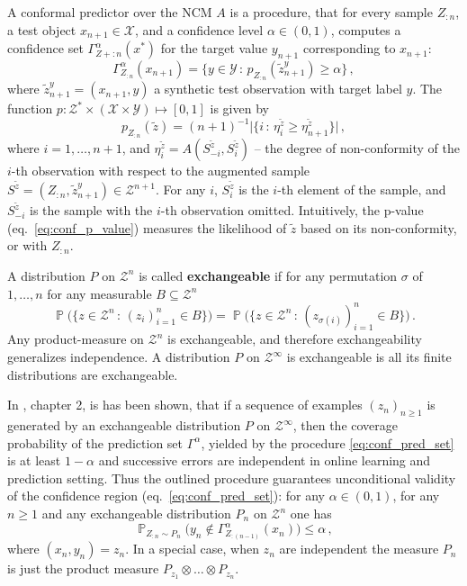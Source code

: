 \documentclass[a4paper,14pt]{extarticle}
\newcommand{\pr}{\mathop{\mathbb{P}}\nolimits}
\newcommand{\Xcal}{\mathcal{X}}
\newcommand{\Ycal}{\mathcal{Y}}
\newcommand{\Zcal}{\mathcal{Z}}
\begin{document}
A conformal predictor over the NCM $A$ is a procedure, that for every sample $Z_{:n}$,
a test object $x_{n+1} \in \Xcal$, and a confidence level $\alpha\in(0,1)$, computes
a confidence set $\Gamma_{Z+{:n}}^\alpha(x^*)$ for the target value $y_{n+1}$ corresponding
to $x_{n+1}$:
\begin{equation} \label{eq:conf_pred_set}
  \Gamma_{Z_{:n}}^\alpha(x_{n+1})
    = \bigl\{ y\in \Ycal \,:\, p_{Z_{:n}}(\tilde{z}^y_{n+1}) \geq \alpha \bigr\} \,,
\end{equation}
where $\tilde{z}^y_{n+1} = (x_{n+1}, y)$ a synthetic test observation with target
label $y$. The function $p:\Zcal^*\times (\Xcal\times \Ycal)\mapsto [0,1]$ is given
by
\begin{equation} \label{eq:conf_p_value}
  p_{Z_{:n}}(\tilde{z})
    = (n+1)^{-1} \bigl\lvert\{ i \,:\,
      \eta_i^{\tilde{z}} \geq \eta_{n+1}^{\tilde{z}} \}\bigr\rvert \,,
\end{equation}
where $i=1,\ldots, n+1$, and $\eta_i^{\tilde{z}} = A(S^{\tilde{z}}_{-i}, S^{\tilde{z}}_i)$
-- the degree of non-conformity of the $i$-th observation with respect to the augmented
sample $S^{\tilde{z}} = (Z_{:n}, {\tilde{z}}^y_{n+1}) \in \Zcal^{n+1}$. For any $i$,
$S^{\tilde{z}}_i$ is the $i$-th element of the sample, and $S^{\tilde{z}}_{-i}$ is
the sample with the $i$-th observation omitted. Intuitively, the p-value (eq.~\ref{eq:conf_p_value})
measures the likelihood of $\tilde{z}$ based on its non-conformity, or with $Z_{:n}$.

A distribution $P$ on $\Zcal^n$ is called \textbf{exchangeable} if for any permutation
$\sigma$ of ${1,\ldots,n}$ for any measurable $B\subseteq \Zcal^n$
\begin{equation} \label{eq:exchangeability}
  \pr\bigl(\{z\in\Zcal^n \,:\, (z_i)_{i=1}^n\in B\}\bigr)
  = \pr\bigl(\{z\in\Zcal^n \,:\, (z_{\sigma(i)})_{i=1}^n \in B\} \bigr)\,.
\end{equation}
Any product-measure on $\Zcal^n$ is exchangeable, and therefore exchangeability
generalizes independence. A distribution $P$ on $\Zcal^\infty$ is exchangeable
is all its finite distributions are exchangeable.

In \cite{vovk2005}, chapter 2, is has been shown, that if a sequence of examples
$(z_n)_{n \geq1}$ is generated by an exchangeable distribution $P$ on $\Zcal^\infty$,
then the coverage probability of the prediction set $\Gamma^\alpha$, yielded by
the procedure \ref{eq:conf_pred_set} is at least $1-\alpha$ and successive errors
are independent in online learning and prediction setting. Thus the outlined procedure
guarantees unconditional validity of the confidence region (eq.~\ref{eq:conf_pred_set}):
for any $\alpha \in (0,1)$, for any $n\geq1$ and any exchangeable distribution
$P_n$ on $\Zcal^n$ one has
\begin{equation} \label{eq:conservative_coverage}
  \pr_{Z_{:n}\sim P_n} \bigl(
    y_n \notin \Gamma^\alpha_{Z_{:(n-1)}}(x_n)
  \bigr) \leq \alpha \,,
\end{equation} 
where $(x_n, y_n) = z_n$. In a special case, when $z_n$ are independent the measure
$P_n$ is just the product measure $P_{z_1} \otimes \ldots \otimes P_{z_n}$.
\end{document}
